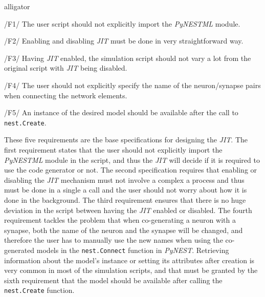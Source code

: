 \begin{labeling}{alligator}
   \item  [/F1/] The user script should not explicitly import the \emph{PyNESTML} module. \\
   
     
   \item [/F2/] Enabling and disabling \emph{JIT} must be done in very straightforward way.\\
   
   \item  [/F3/] Having \emph{JIT} enabled, the simulation script should not vary a lot from the original script with \emph{JIT} being disabled.\\
 
   \item  [/F4/]\label{req:F4} The user should not explicitly specify the name of the neuron/synapse pairs when connecting the network elements.\\
   
   \item  [/F5/] An instance of the desired model should be available after the call to \texttt{nest.Create}.\\
   
\end{labeling}

These five requirements are the base specifications for designing the \emph{JIT}. The first requirement states that the user should not explicitly import the \emph{PyNESTML} module in the script, and thus the \emph{JIT} will decide if it is required to use the code generator or not. The second specification requires that enabling or disabling the \emph{JIT} mechanism must not involve a complex a process and thus must be done in a single a call and the user should not worry about how it is done in the background. The third requirement ensures that there is no huge deviation in the script between having the \emph{JIT} enabled or disabled. The fourth requirement tackles the problem that when co-generating a neuron with a synapse, both the name of the neuron and the synapse will be changed, and therefore the user has to manually use the new names when using the co-generated models in the \texttt{nest.Connect} function in \emph{PyNEST}. Retrieving information about the model's instance or setting its attributes after creation is very common in most of the simulation scripts, and that must be granted by the sixth requirement that the model should be available after calling the \texttt{nest.Create} function.

